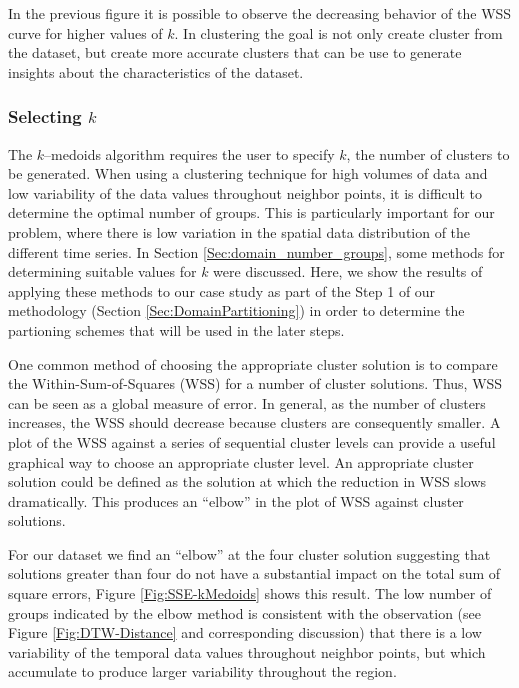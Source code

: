 In the previous figure it is possible to observe the decreasing behavior of the WSS curve for higher values of $k$. In clustering the goal is not only create cluster from the dataset, but create more accurate clusters that can be use to generate insights about the characteristics of the dataset.

\subsubsection{Selecting $k$}
\label{Sec:Selectk}

The $k$--medoids algorithm requires the user to specify $k$, the number of clusters to be generated. When using a clustering technique for high volumes of data and low variability of the data values throughout neighbor points, it is difficult to determine the optimal number of groups. This is particularly important for our problem, where there is low variation in the spatial data distribution of the different time series. In Section \ref{Sec:domain_number_groups}, some methods for determining suitable values for $k$ were discussed. Here, we show the results of applying these methods to our case study as part of the Step 1 of our methodology (Section \ref{Sec:DomainPartitioning}) in order to determine the partioning schemes that will be used in the later steps.

One common method of choosing the appropriate cluster solution is to compare the Within-Sum-of-Squares (WSS) for a number of cluster solutions. Thus, WSS can be seen as a global measure of error. In general, as the number of clusters increases, the WSS should decrease because clusters are consequently smaller. A plot of the WSS against a series of sequential cluster levels can provide a useful graphical way to choose an appropriate cluster level. An appropriate cluster solution could be defined as the solution at which the reduction in WSS slows dramatically. This produces an ``elbow'' in the plot of WSS against cluster solutions. 

For our dataset we find an ``elbow'' at the four cluster solution suggesting that solutions greater than four do not have a substantial impact on the total sum of square errors, Figure \ref{Fig:SSE-kMedoids} shows this result. The low number of groups indicated by the elbow method is consistent with the observation (see Figure \ref{Fig:DTW-Distance} and corresponding discussion) that there is a low variability of the temporal data values throughout neighbor points, but which accumulate to produce larger variability throughout the region.

